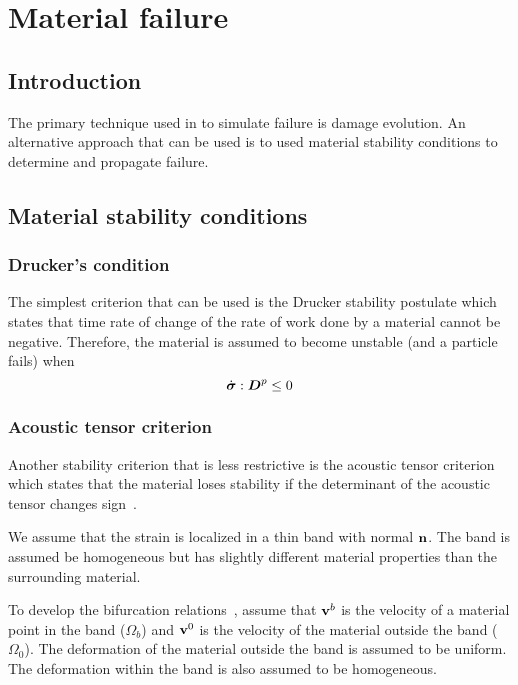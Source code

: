 \chapter{Material failure}

\section{Introduction}
The primary technique used in \Vaango to simulate failure is damage evolution. An alternative
approach that can be used is to used material stability conditions to determine and propagate 
failure.

\section{Material stability conditions}
\subsection{Drucker's condition}
The simplest criterion that can be used is the Drucker stability postulate 
\cite{Drucker1959} which states that time rate of change of the rate of 
work done by a material cannot be negative.  Therefore, the material is 
assumed to become unstable (and a particle fails) when
\begin{equation}
  \dot{\boldsymbol{\sigma}}:\boldsymbol{D}^p \le 0
\end{equation}

\subsection{Acoustic tensor criterion}
Another stability criterion that is less restrictive is the acoustic
tensor criterion which states that the material loses stability if the 
determinant of the acoustic tensor changes sign~\cite{Rudnicki1975,Yamamoto1978,Perzyna1998}.  

We assume that the strain is localized in a thin band with normal $\mathbf{n}$.  The band is 
assumed be homogeneous
but has slightly different material properties than the surrounding material.

To develop the bifurcation relations~\cite{Yamamoto1978}, assume that $\mathbf{v}^b$ is the 
velocity of a material point in the band ($\Omega_b$) and $\mathbf{v}^0$ is the velocity of the 
material outside the band ($\Omega_0$).  The deformation of the material outside the band
is assumed to be uniform.  The deformation within the band is also assumed to
be homogeneous.

